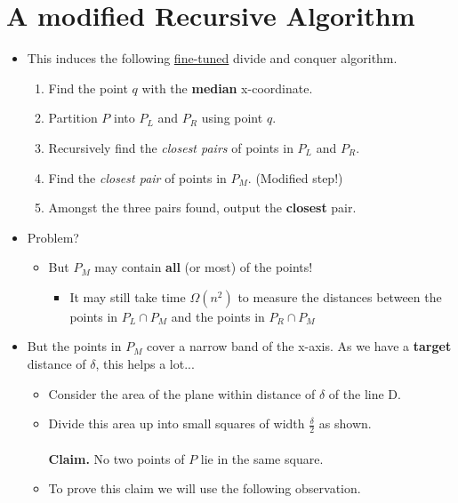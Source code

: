 \documentclass[12pt]{article}
\begin{document}
\section{A modified Recursive Algorithm}
\renewcommand{\labelitemii}{$\circ$}
\renewcommand{\labelitemiii}{$\cdot$}
\renewcommand{\labelitemiii}{$\rightarrow$}
\renewcommand{\labelitemiv}{$\star$}	
\begin{itemize}
\item This induces the following \underline{fine-tuned} divide and conquer algorithm.
	\begin{enumerate}
	\item Find the point $q$ with the \textbf{median} x-coordinate.
	\item Partition $P$ into $P_L$ and $P_R$ using point $q$.
	\item Recursively find the \textit{closest pairs} of points in $P_L$ and $P_R$.
	\item Find the \textit{closest pair} of points in $P_M$. (Modified step!)
	\item Amongst the three pairs found, output the \textbf{closest} pair.
	\end{enumerate}
\item Problem?
	\begin{itemize}
	\item But $P_M$ may contain \textbf{all} (or most) of the points!
		\begin{itemize}
		\item It may still take time $\Omega(n^2)$ to measure the distances between the points in $P_L \cap P_M$ and the points in $P_R \cap P_M$
		\end{itemize} 
	\end{itemize}
\item But the points in $P_M$ cover a narrow band of the x-axis. As we have a \textbf{target} distance of $\delta$, this helps a lot...
	\begin{itemize}
	\item Consider the area of the plane within distance of $\delta$ of the line D.
	\item Divide this area up into small squares of width {\large $\frac{\delta}{2}$} as shown.\\
	\\
	\textbf{Claim.} No two points of $P$ lie in the same square.
	\\
	\item To prove this claim we will use the following observation.\\

\end{itemize}
\end{itemize}
\end{document}
